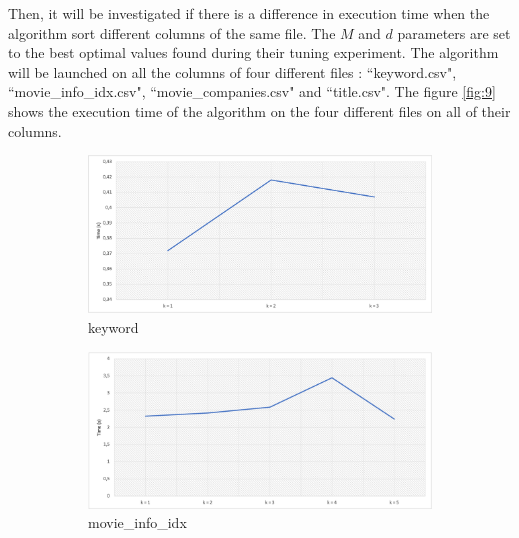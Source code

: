 \documentclass[12pt]{article}
\begin{document}
Then, it will be investigated if there is a difference in execution time when the algorithm sort different columns of the same file. The $M$ and $d$ parameters are set to the best optimal values found during their tuning experiment. The algorithm will be launched on all the columns of four different files : ``keyword.csv", ``movie\_info\_idx.csv", ``movie\_companies.csv" and ``title.csv". The figure \ref{fig:9} shows the execution time of the algorithm on the four different files on all of their columns.

\begin{figure}[H] 
\begin{adjustwidth}{-3.5cm}{-3.5cm}
  \begin{subfigure}[b]{0.5\linewidth}
    \centering
    \includegraphics[width=0.99\linewidth]{images/keyword.png} 
    \caption{keyword} 
    \label{fig:9a} 
    \vspace{4ex}
  \end{subfigure}%
  \begin{subfigure}[b]{0.5\linewidth}
    \centering
    \includegraphics[width=0.99\linewidth]{images/movie_info_idx.png} 
    \caption{movie\_info\_idx} 
    \label{fig:9b} 
    \vspace{4ex}
  \end{subfigure} 
  \begin{subfigure}[b]{0.5\linewidth}

\end{subfigure}
\end{adjustwidth}
\end{figure}
\end{document}
